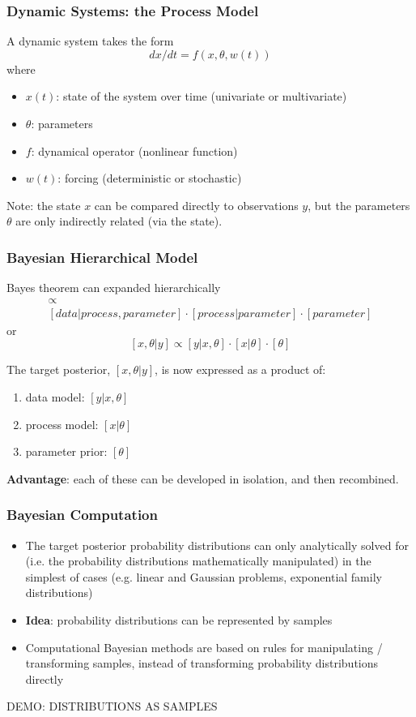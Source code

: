 \documentclass{beamer}
\renewcommand{\bf}{\bfseries}
\begin{document}

\frame%
{\frametitle{Dynamic Systems: the Process Model}
A dynamic system takes the form
\[
dx/dt = f(x,\theta,w(t))
\] 
\pause
where 
\begin{itemize}
\item
$x(t)$: state of the system over time (univariate or multivariate)
\pause
\item
$\theta$: parameters
\pause
\item
$f$: dynamical operator (nonlinear function)
\pause
\item
$w(t)$: forcing (deterministic or stochastic)
\end{itemize}

\pause
\medskip
Note:  the state $x$ can be compared directly to observations $y$, but the parameters $\theta$ are only indirectly related (via the state).
}

\frame%
{\frametitle{Bayesian Hierarchical Model}

Bayes theorem can expanded hierarchically
\begin{multline*}
[process, parameter | data]  \propto  \\ [data | process, parameter] \cdot [process | parameter] \cdot [parameter]
\end{multline*}
\pause
or
\[
[x,\theta | y] \propto [y | x, \theta] \cdot [x | \theta] \cdot [\theta]
\]

\pause
\medskip
The target posterior, $[x,\theta | y]$, is now expressed as a product of: 
\begin{enumerate}
\pause
\item
data model: $[y | x, \theta]$
\pause
\item
process model:  $[x | \theta]$
\pause
\item
parameter prior:  $[\theta]$
\end{enumerate}
\pause
{\bf Advantage}: each of these can be developed in isolation, and then recombined. 
}

\frame%
{\frametitle{Bayesian Computation}

\begin{itemize}
\item
The target posterior probability distributions can only analytically solved for (i.e. the probability distributions mathematically manipulated) in the simplest of cases (e.g. linear and Gaussian problems, exponential family distributions)
\pause
\item
{\bf Idea}: probability distributions can be represented by samples 
\pause
\item
Computational Bayesian methods are based on rules for manipulating / transforming samples, instead of transforming probability distributions directly
\end{itemize}

\pause
\color{red} DEMO: DISTRIBUTIONS AS SAMPLES
}
\end{document}
